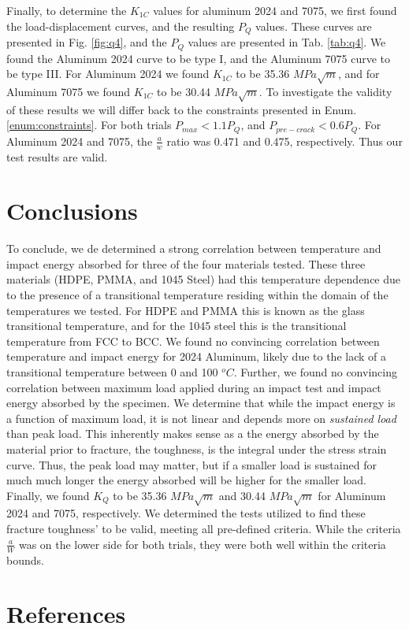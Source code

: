\documentclass{article}
\begin{document}
Finally, to determine the $K_{1C}$ values for aluminum 2024 and 7075, we first found the load-displacement curves, and the resulting $P_Q$ values. These curves are presented in Fig. \ref{fig:q4}, and the $P_Q$ values are presented in Tab. \ref{tab:q4}. We found the Aluminum 2024 curve to be type I, and the Aluminum 7075 curve to be type III. For Aluminum 2024 we found $K_{1C}$ to be 35.36 $MPa\sqrt{m}$, and for Aluminum 7075 we found $K_{1C}$ to be 30.44 $MPa\sqrt{m}$. To investigate the validity of these results we will differ back to the constraints presented in Enum. \ref{enum:constraints}. For both trials $P_{max} < 1.1 P_Q$, and $P_{pre-crack} < 0.6 P_Q$. For Aluminum 2024 and 7075, the $\frac{a}{w}$ ratio
was 0.471 and 0.475, respectively. Thus our test results are valid. 
\section{Conclusions}
To conclude, we de determined a strong correlation between temperature and impact energy absorbed for three of the four materials tested. These three materials (HDPE, PMMA, and 1045 Steel) had this temperature dependence due to the presence of a transitional temperature residing within the domain of the temperatures we tested. For HDPE and PMMA this is known as the glass transitional temperature, and for the 1045 steel this is the transitional temperature from FCC to BCC. We found no convincing correlation between temperature and impact energy for 2024 Aluminum, likely due to the lack of a transitional temperature between 0 and 100 $^oC$. Further, we found no convincing correlation between maximum load applied during an impact test and impact energy absorbed by the specimen. We determine that while the impact energy is a function of maximum load, it is not linear and depends more on \textit{sustained load} than peak load. This inherently makes sense as a the energy absorbed by the material prior to fracture, the toughness, is the integral under the stress strain curve. Thus, the peak load may matter, but if a smaller load is sustained for much much longer the energy absorbed will be higher for the smaller load. Finally, we found $K_Q$ to be 35.36 $MPa\sqrt{m}$ and 30.44 $MPa\sqrt{m}$ for Aluminum 2024 and 7075, respectively. We determined the tests utilized to find these fracture toughness' to be valid, meeting all pre-defined criteria. While the criteria $\frac{a}{W}$ was on the lower side for both trials, they were both well within the criteria bounds. 
\section{References}

\printbibliography[heading=none]
\end{document}
